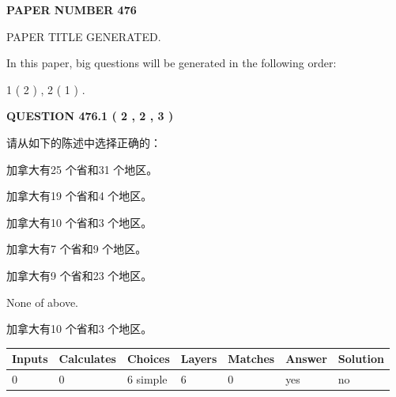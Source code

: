 \documentclass{ctexart}
\begin{document}
   
 {\textbf{ \Large{ PAPER NUMBER  476  }}}
   
   
\vspace{0.2in}
   
   
   
   
   
   
   
   
 \vspace{0.2in}
 
 
 
 
   
   
 PAPER TITLE GENERATED.
   
   
   
\vspace{0.2in}
   
In this paper, big questions will be generated in the following order: 
   
   
   1 ( 2 )
 ,
   2 ( 1 )
 .
  
\vspace{0.2in}
  
{\textbf{\Large{QUESTION
476.1 
 ( 2 , 2 , 3 )
}}}
  
  
请从如下的陈述中选择正确的：
 
 
加拿大有25 个省和31 个地区。
 
 
加拿大有19 个省和4 个地区。
 
 
加拿大有10 个省和3 个地区。
 
 
加拿大有7 个省和9 个地区。
 
 
加拿大有9 个省和23 个地区。
 
 
 None of above.
 
 
\noindent{}
 
 
加拿大有10 个省和3 个地区。
 
 
\noindent{}
 
 
   
   
   
   
\noindent\begin{tabular}{|l|l|l|l|l|l|l|}
 \hline
Inputs & Calculates & Choices & Layers & Matches & Answer & Solution \\ \hline
 0  & 
 0  & 
 6
  simple  
  & 
 6  & 
 0  & 
  yes & 
  no 
  \\ \hline
 \end{tabular}
   
\end{document}
